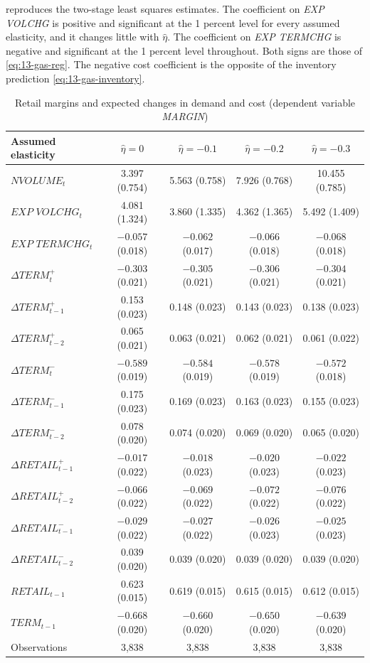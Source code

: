  reproduces the two-stage least squares estimates. The coefficient on \textit{EXP VOLCHG} is
positive and significant at the 1 percent level for every assumed elasticity, and it changes little with
$\hat\eta$. The coefficient on \textit{EXP TERMCHG} is negative and significant at the 1 percent level
throughout. Both signs are those of \eqref{eq:13-gas-reg}. The negative cost coefficient is the opposite of the
inventory prediction \eqref{eq:13-gas-inventory}.

\begin{table}[htbp]
\centering
\caption{Retail margins and expected changes in demand and cost (dependent variable \textit{MARGIN})}\label{tab:13-bs-t2}
\small
\begin{tabular}{lcccc}
\toprule
Assumed elasticity & $\hat\eta=0$ & $\hat\eta=-0.1$ & $\hat\eta=-0.2$ & $\hat\eta=-0.3$\\
\midrule
$\textit{NVOLUME}_t$ & 3.397 (0.754) & 5.563 (0.758) & 7.926 (0.768) & 10.455 (0.785)\\
$\textit{EXP VOLCHG}_t$ & 4.081 (1.324) & 3.860 (1.335) & 4.362 (1.365) & 5.492 (1.409)\\
$\textit{EXP TERMCHG}_t$ & $-0.057$ (0.018) & $-0.062$ (0.017) & $-0.066$ (0.018) & $-0.068$ (0.018)\\
\addlinespace
$\Delta\textit{TERM}^{+}_t$ & $-0.303$ (0.021) & $-0.305$ (0.021) & $-0.306$ (0.021) & $-0.304$ (0.021)\\
$\Delta\textit{TERM}^{+}_{t-1}$ & 0.153 (0.023) & 0.148 (0.023) & 0.143 (0.023) & 0.138 (0.023)\\
$\Delta\textit{TERM}^{+}_{t-2}$ & 0.065 (0.021) & 0.063 (0.021) & 0.062 (0.021) & 0.061 (0.022)\\
$\Delta\textit{TERM}^{-}_t$ & $-0.589$ (0.019) & $-0.584$ (0.019) & $-0.578$ (0.019) & $-0.572$ (0.018)\\
$\Delta\textit{TERM}^{-}_{t-1}$ & 0.175 (0.023) & 0.169 (0.023) & 0.163 (0.023) & 0.155 (0.023)\\
$\Delta\textit{TERM}^{-}_{t-2}$ & 0.078 (0.020) & 0.074 (0.020) & 0.069 (0.020) & 0.065 (0.020)\\
$\Delta\textit{RETAIL}^{+}_{t-1}$ & $-0.017$ (0.022) & $-0.018$ (0.023) & $-0.020$ (0.023) & $-0.022$ (0.023)\\
$\Delta\textit{RETAIL}^{+}_{t-2}$ & $-0.066$ (0.022) & $-0.069$ (0.022) & $-0.072$ (0.022) & $-0.076$ (0.022)\\
$\Delta\textit{RETAIL}^{-}_{t-1}$ & $-0.029$ (0.022) & $-0.027$ (0.022) & $-0.026$ (0.023) & $-0.025$ (0.023)\\
$\Delta\textit{RETAIL}^{-}_{t-2}$ & 0.039 (0.020) & 0.039 (0.020) & 0.039 (0.020) & 0.039 (0.020)\\
$\textit{RETAIL}_{t-1}$ & 0.623 (0.015) & 0.619 (0.015) & 0.615 (0.015) & 0.612 (0.015)\\
$\textit{TERM}_{t-1}$ & $-0.668$ (0.020) & $-0.660$ (0.020) & $-0.650$ (0.020) & $-0.639$ (0.020)\\
\addlinespace
Observations & 3,838 & 3,838 & 3,838 & 3,838\\
\bottomrule
\end{tabular}


\end{table}
